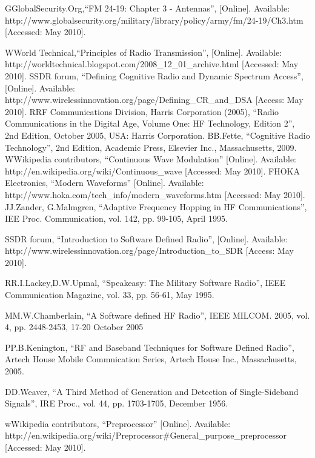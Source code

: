 \documentclass[conference]{IEEEtran}
\begin{document}
%
%
%
\begin{thebibliography}{1}

\bibitem
GGlobalSecurity.Org,“FM 24-19: Chapter 3 - Antennas”, [Online]. Available: http://www.globalsecurity.org/military/library/policy/army/fm/24-19/Ch3.htm [Accessed: May 2010].

\bibitem
WWorld Technical,“Principles of Radio Transmission”, [Online]. Available: 
http://worldtechnical.blogspot.com/2008\_12\_01\_archive.html [Accessed: May 2010]. 
\bibitem
SSDR forum, “Defining Cognitive Radio and Dynamic Spectrum Access”, [Online]. Available: http://www.wirelessinnovation.org/page/Defining\_CR\_and\_DSA   [Access: May 2010].
\bibitem
RRF Communications Division, Harris Corporation (2005), “Radio Communications in the Digital Age, Volume One: HF Technology, Edition 2”, 2nd Edition, October 2005, USA: Harris Corporation.
\bibitem
BB.Fette, “Cognitive Radio Technology”, 2nd Edition, Academic Press, Elsevier Inc., Massachusetts, 2009.
\bibitem
WWikipedia contributors, “Continuous Wave Modulation” [Online]. Available: http://en.wikipedia.org/wiki/Continuous\_wave [Accessed: May 2010]. 
\bibitem
FHOKA Electronics, “Modern Waveforms” [Online]. Available: http://www.hoka.com/tech\_info/modern\_waveforms.htm [Accessed: May 2010].
\bibitem
JJ.Zander, G.Malmgren, “Adaptive Frequency Hopping in HF Communications”, IEE Proc. Communication, vol. 142, pp. 99-105, April 1995. 

\bibitem
SSDR forum, “Introduction to Software Defined Radio”, [Online]. Available: http://www.wirelessinnovation.org/page/Introduction\_to\_SDR  [Access: May 2010].

\bibitem
RR.I.Lackey,D.W.Upmal, “Speakeasy: The Military Software Radio”, IEEE Communication Magazine, vol. 33, pp. 56-61, May 1995.  

\bibitem
MM.W.Chamberlain, “A Software defined HF Radio”, IEEE MILCOM. 2005, vol. 4, pp. 2448-2453, 17-20 October 2005 

\bibitem
PP.B.Kenington, “RF and Baseband Techniques for Software Defined Radio”, Artech House Mobile Commnication Series, Artech House Inc., Massachusetts, 2005.

\bibitem
DD.Weaver, “A Third Method of Generation and Detection of Single-Sideband Signals”, IRE Proc., vol. 44, pp. 1703-1705, December 1956.


\bibitem
 wWikipedia contributors, “Preprocessor” [Online]. Available: http://en.wikipedia.org/wiki/Preprocessor\#General\_purpose\_preprocessor   [Accessed: May 2010].

  
\end{thebibliography}



\end{document}
